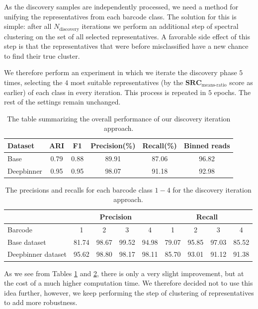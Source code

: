 As the discovery samples are independently processed, we need a method for unifying the representatives from each barcode class. The solution for this is simple: after all $N_{\text{discovery}}$ iterations we perform an additional step of spectral clustering on the set of all selected representatives. A favorable side effect of this step is that the representatives that were before misclassified have a new chance to find their true cluster.

We therefore perform an experiment in which we iterate the discovery phase $5$ times, selecting the $4$ most suitable representatives (by the $\textbf{SRC}_{\text{means-ratio}}$ score as earlier) of each class in every iteration. This process is repeated in $5$ epochs. The rest of the settings remain unchanged.

\begin{table}[]
\centering
\begin{tabular}{|l|ccccc|}
\hline
Dataset & ARI &  F1 & Precision(\%) & Recall(\%) & Binned reads\\
\hline
Base & 0.79 & 0.88 & 89.91 & 87.06 & 96.82\\
Deepbinner & 0.95 & 0.95 & 98.07 & 91.18 & 92.98\\
\hline
\end{tabular}
\caption{The table summarizing the overall performance of our discovery iteration approach.}
\label{tab:discovery_iteration_overall}
\end{table}

\begin{table}[!htbp]
\centering
\begin{tabular}{lcccc|cccc}
\toprule
 &  \multicolumn{4}{c}{Precision} & \multicolumn{4}{c}{Recall}\\
\midrule
Barcode & 1 & 2 & 3 & 4 & 1 & 2 & 3 & 4 \\
\hline
Base dataset & 81.74 & 98.67 & 99.52 & 94.98 & 79.07 & 95.85 & 97.03 & 85.52\\
Deepbinner dataset & 95.62 & 98.80 & 98.17 & 98.11 & 85.70 & 93.01 & 91.12 & 91.38\\
\bottomrule
\end{tabular}
\caption[Discovery iteration in terms of classes]{The precisions and recalls for each barcode class $1-4$ for the discovery iteration approach.}
\label{tab:discovery_iteration_classes}
\end{table}

As we see from Tables \ref{tab:discovery_iteration_overall} and \ref{tab:discovery_iteration_classes}, there is only a very slight improvement, but at the cost of a much higher computation time. We therefore decided not to use this idea further, however, we  keep performing the step of clustering of representatives to add more robustness.

